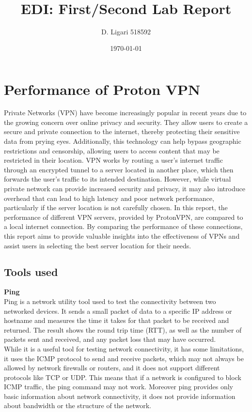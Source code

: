 \documentclass[eng]{class}
\title{EDI: First/Second Lab Report}
\author[1]{D. Ligari 518592}
\affil[1]{University of Pavia, Department of Computer Engineering (Data Science), Pavia, Italy}
\date{\today}
\begin{document}
\maketitle
\tableofcontents
\thispagestyle{FirstPage}
\vspace{\baselineskip}
\section{Performance of Proton VPN}
 Private Networks (VPN) have become increasingly popular in recent years due to the growing concern over online privacy and security.
They allow users to create a secure and private connection to the internet, thereby protecting their sensitive data from prying eyes.
Additionally, this technology can help bypass geographic restrictions and censorship, allowing users to access content that may be restricted in their location.
VPN works by routing a user's internet traffic through an encrypted tunnel to a server located in another place,
which then forwards the user's traffic to its intended destination.
However, while virtual private network can provide increased security and privacy, it may also introduce overhead
that can lead to high latency and poor network performance, particularly if the server location is not carefully chosen.
In this report, the performance of different VPN servers, provided by ProtonVPN, are compared to a local internet connection.
By comparing the performance of these connections, this report aims to provide valuable insights into the effectiveness of VPNs and assist users in selecting the best server location for their needs.
\subsection{Tools used}
\textbf{Ping} \\
Ping is a network utility tool used to test the connectivity between two networked devices.
It sends a small packet of data to a specific IP address or hostname and measures the time it takes for that packet to be received and returned.
The result shows the round trip time (RTT), as well as the number of packets sent and received, and any packet loss that may have occurred.\\
While it is a useful tool for testing network connectivity, it has some limitations,
it uses the ICMP protocol to send and receive packets, which may not always be allowed by network firewalls or routers, and it does not support different protocols like TCP or UDP.
This means that if a network is configured to block ICMP traffic, the ping command may not work.
Moreover ping provides only basic information about network connectivity, it does not provide information about bandwidth or the structure of the network.\\
\\
\pagestyle{OtherPage}
\end{document}
